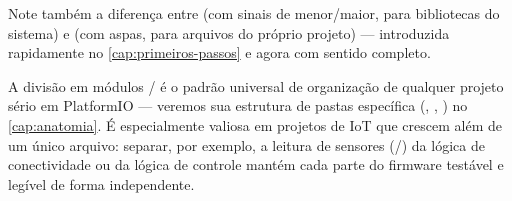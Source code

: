 \begin{dica}
Note também a diferença entre  (com sinais de menor/maior, para bibliotecas do sistema) e  (com aspas, para arquivos do próprio projeto) — introduzida rapidamente no \cref{cap:primeiros-passos} e agora com sentido completo.
\end{dica}

\begin{esp32box}
A divisão em módulos / é o padrão universal de organização de qualquer projeto sério em PlatformIO — veremos sua estrutura de pastas específica (, , ) no \cref{cap:anatomia}. É especialmente valiosa em projetos de IoT que crescem além de um único arquivo: separar, por exemplo, a leitura de sensores (/) da lógica de conectividade ou da lógica de controle mantém cada parte do firmware testável e legível de forma independente.
\end{esp32box}
